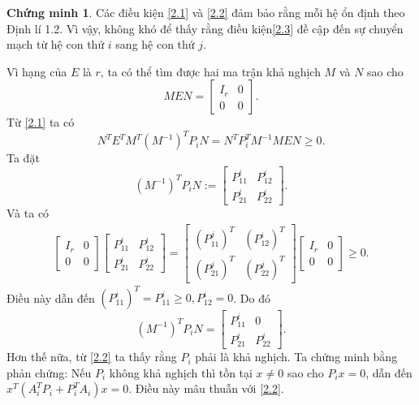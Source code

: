 \documentclass[12pt,a4paper]{report}
\theoremstyle{definition}
\newtheorem*{cv}{Chứng minh}
\theoremstyle{definition}
\numberwithin{dl}{chapter}
\numberwithin{vd}{chapter}
\numberwithin{corollary}{chapter}
\numberwithin{lemma}{chapter}
\numberwithin{md}{chapter}
\numberwithin{dn}{chapter}
\numberwithin{cy}{chapter}
\numberwithin{nx}{chapter}
\begin{document}
\begin{cv} Các điều kiện \eqref{2.1} và \eqref{2.2} đảm bảo rằng mỗi hệ ổn định theo Định lí 1.2. Vì vậy, không khó để thấy rằng điều kiện\eqref{2.3} đề cập đến sự chuyển mạch từ hệ con thứ $i$ sang hệ con thứ $j$.

Vì hạng của $E$ là $r$, ta có thể tìm được hai ma trận khả nghịch $M$ và $N$ sao cho
\begin{equation}\label{2.4}
M E N=\left[\begin{array}{cc}
I_{r} & 0 \\
0 & 0
\end{array}\right]. 
\end{equation}
Từ \eqref{2.1} ta có
\begin{equation}\label{2.5}
N^{T} E^{T} M^{T}\left(M^{-1}\right)^{T} P_{i} N=N^{T} P_{i}^{T} M^{-1} M E N \geq 0. 
\end{equation}
Ta đặt
$$
\left(M^{-1}\right)^{T} P_{i} N:=\left[\begin{array}{cc}
P_{11}^{i} & P_{12}^{i} \\
P_{21}^{i} & P_{22}^{i}
\end{array}\right].
$$
Và ta có
\begin{equation} \label{2.6}
\begin{gathered}
{\left[\begin{array}{cc}
I_{r} & 0 \\
0 & 0
\end{array}\right]\left[\begin{array}{cc}
P_{11}^{i} & P_{12}^{i} \\
P_{21}^{i} & P_{22}^{i}
\end{array}\right]} =\left[\begin{array}{cc}
(P_{11}^{j})^T & (P_{12}^{i})^T \\
(P_{21}^{j})^T & (P_{22}^{j})^T
\end{array}\right]\left[\begin{array}{cc}
I_{r} & 0 \\
0 & 0
\end{array}\right] \geq 0. 
\end{gathered}
\end{equation}
Điều này dẫn đến $\left(P_{11}^{i}\right)^{T}=P_{11}^{i} \geq 0, P_{12}^{i}=0$. Do đó
\begin{equation}\label{2.7}
\left(M^{-1}\right)^{T} P_{i} N=\left[\begin{array}{cc}
P_{11}^{i} & 0 \\
P_{21}^{i} & P_{22}^{i}
\end{array}\right].
\end{equation}
Hơn thế nữa, từ \eqref{2.2} ta thấy rằng $P_{i}$ phải là khả nghịch. Ta chứng minh bằng phản chứng: Nếu $P_{i}$ không khả nghịch thì tồn tại $x \neq 0$ sao cho $P_{i} x=0$, dẫn đến $x^{T}\left(A_{i}^{T} P_{i}+P_{i}^{T} A_{i}\right) x=0$. Điều này mâu thuẫn với \eqref{2.2}. 


\end{cv}
\end{document}

